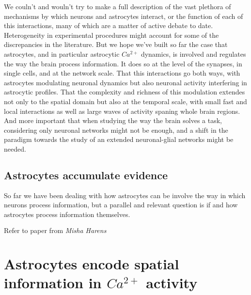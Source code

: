 We couln't and wouln't try to make a full description of the vast plethora of mechanisms by which neurons and astrocytes interact, or the function of each of this interactions, many of which are a matter of active debate to date. 
Heterogeneity in experimental procedures might account for some of the discrepancies in the literature.
But we hope we've built so far the case that astrocytes, and in particular astrocytic $Ca^{2+}$ dynamics, is involved and regulates the way the brain process information.
It does so at the level of the synapses, in single cells, and at the network scale.
That this interactions go both ways, with astrocytes modulating neuronal dynamics but also neuronal 
activity interfering in astrocytic profiles.
That the complexity and richness of this modulation extendes not only to the spatial domain but also at the temporal scale, with small fast and local interactions as well as large waves of activity spaning whole brain regions.
And more important that when studying the way the brain solves a task, considering only neuronal networks might not be enough, and a shift in the paradigm towards the study of an extended neuronal-glial networks might be needed. 

\subsection{Astrocytes accumulate evidence}
\label{chap1:sec:2:subsec4:astro_evidence}
So far we have been dealing with how astrocytes can be involve the way in which neurons process information, but a parallel and relevant question is if and how astrocytes process information themselves. 

Refer to paper from \textit{Misha Harens}


\section{Astrocytes encode spatial information in $Ca^{2+}$ activity}
\label{chap1:sec3:astro_spat_info}

